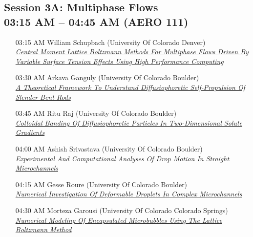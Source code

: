 \subsection*{Session 3A: Multiphase Flows \\ 03:15 AM  -- 04:45 AM (AERO 111)}
\begin{enumerate}
\item [03:15 AM] William Schupbach (University Of Colorado Denver) \\ \hyperlink{WilliamSchupbach}{\it Central Moment Lattice Boltzmann Methods For Multiphase Flows  Driven By Variable Surface Tension Effects Using High Performance Computing }
\item [03:30 AM] Arkava Ganguly (University Of Colorado Boulder) \\ \hyperlink{ArkavaGanguly}{\it A Theoretical Framework To Understand Diffusiophoretic Self-Propulsion Of Slender Bent Rods }
\item [03:45 AM] Ritu Raj (University Of Colorado Boulder) \\ \hyperlink{RituRaj}{\it Colloidal Banding Of Diffusiophoretic Particles In Two-Dimensional Solute Gradients }
\item [04:00 AM] Ashish Srivastava (University Of Colorado Boulder) \\ \hyperlink{AshishSrivastava}{\it Experimental And Computational Analyses Of Drop Motion In Straight Microchannels }
\item [04:15 AM] Gesse Roure (University Of Colorado Boulder) \\ \hyperlink{GesseRoure}{\it Numerical Investigation Of Deformable Droplets In Complex Microchannels }
\item [04:30 AM] Morteza Garousi (University Of Colorado Colorado Springs) \\ \hyperlink{MortezaGarousi}{\it Numerical Modeling Of Encapsulated Microbubbles Using The Lattice Boltzmann Method }
\end{enumerate}

